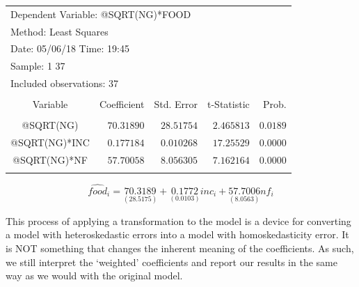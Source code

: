 \documentclass[12pt]{report}
\begin{document}
\begin{table}[H]
	\centering
	\begin{tabular}{lrrrr}
		\multicolumn{4}{l}{Dependent Variable: @SQRT(NG)*FOOD}&\multicolumn{1}{c}{}\\
		\multicolumn{3}{l}{Method: Least Squares}&\multicolumn{1}{c}{}&\multicolumn{1}{c}{}\\
		\multicolumn{3}{l}{Date: 05/06/18   Time: 19:45}&\multicolumn{1}{c}{}&\multicolumn{1}{c}{}\\
		\multicolumn{2}{l}{Sample: 1 37}&\multicolumn{1}{c}{}&\multicolumn{1}{c}{}&\multicolumn{1}{c}{}\\
		\multicolumn{3}{l}{Included observations: 37}&\multicolumn{1}{c}{}&\multicolumn{1}{c}{}\\
		[4.5pt] \hline \\ [-4.5pt]
		\multicolumn{1}{c}{Variable}&\multicolumn{1}{r}{Coefficient}&\multicolumn{1}{r}{Std. Error}&\multicolumn{1}{r}{t-Statistic}&\multicolumn{1}{r}{Prob.}\\
		[4.5pt] \hline \\ [-4.5pt]
		\multicolumn{1}{c}{@SQRT(NG)}&\multicolumn{1}{r}{$70.31890$}&\multicolumn{1}{r}{$28.51754$}&\multicolumn{1}{r}{$2.465813$}&\multicolumn{1}{r}{$0.0189$}\\
		\multicolumn{1}{c}{@SQRT(NG)*INC}&\multicolumn{1}{r}{$0.177184$}&\multicolumn{1}{r}{$0.010268$}&\multicolumn{1}{r}{$17.25529$}&\multicolumn{1}{r}{$0.0000$}\\
		\multicolumn{1}{c}{@SQRT(NG)*NF}&\multicolumn{1}{r}{$57.70058$}&\multicolumn{1}{r}{$8.056305$}&\multicolumn{1}{r}{$7.162164$}&\multicolumn{1}{r}{$0.0000$}\\
		[4.5pt] \hline \\ [-4.5pt]
	\end{tabular}
\end{table}

$$\widehat{food}_i = \underset{(28.5175)}{70.3189} + \underset{(0.0103)}{0.1772}inc_i + \underset{(8.0563)}{57.7006}nf_i$$

\noindent This process of applying a transformation to the model is a device for converting a model with heteroskedastic errors into a model with homoskedasticity error. It is NOT something that changes the inherent meaning of the coefficients. As such, we still interpret the ‘weighted’ coefficients and report our results in the same way as we would with the original model.
\end{document}

